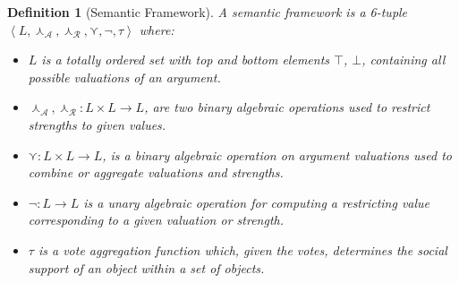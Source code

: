 \documentclass{article}
\newtheorem{definition}{Definition}
\newcommand{\args}{\mathcal{A}} %
\newcommand{\att}{\mathcal{R}}  %
\newcommand{\valueset}{L}
\newcommand{\sembodyNew}{\left\langle \valueset,\SAFand_\mathcal{A}, \SAFand_\mathcal{R},\SAFor,\lnot,\tau \right\rangle} %
\newcommand{\SAFand}{\curlywedge}     %
\newcommand{\SAFor}{\curlyvee}        %
\begin{document}
\begin{definition}[Semantic Framework]
\label{def:semfram}
A semantic framework is a 6-tuple \\$\sembodyNew$ where:

\begin{itemize}
  \item $\valueset$ is a totally ordered set with top and bottom elements $\top$, 
$\bot$, containing all possible valuations of an argument. 

  \item $\SAFand_\args,\SAFand_\att:\valueset\times \valueset\rightarrow \valueset$, are two binary algebraic operations used to restrict strengths to given values.
  
  \item $\SAFor:\valueset\times \valueset\rightarrow \valueset$, is a binary algebraic operation on argument valuations used to combine or aggregate valuations and strengths.
  
  \item $\lnot:\valueset\rightarrow \valueset$ is a unary algebraic operation for computing a restricting value corresponding to a given valuation or strength.
  

  \item $\tau$ is a vote aggregation function which, given the votes, determines the social support of an object within a set of objects.

\end{itemize}
\end{definition}
\end{document}

